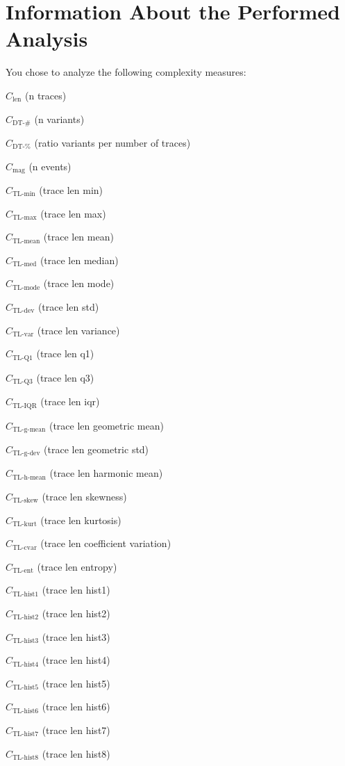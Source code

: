 \documentclass[a4paper]{article}
\newcommand{\magnitudename}{\text{mag}}
\newcommand{\magnitude}{C_{\magnitudename}}
\newcommand{\lengthname}{\text{len}}
\newcommand{\length}{C_{\lengthname}}
\newcommand{\tlminname}{\text{TL-min}}
\newcommand{\tlmin}{C_{\tlminname}}
\newcommand{\tlavgname}{\text{TL-mean}}
\newcommand{\tlavg}{C_{\tlavgname}}
\newcommand{\tlmaxname}{\text{TL-max}}
\newcommand{\tlmax}{C_{\tlmaxname}}
\newcommand{\tlmedname}{\text{TL-med}}
\newcommand{\tlmed}{C_{\tlmedname}}
\newcommand{\tlmodename}{\text{TL-mode}}
\newcommand{\tlmode}{C_{\tlmodename}}
\newcommand{\tldevname}{\text{TL-dev}}
\newcommand{\tldev}{C_{\tldevname}}
\newcommand{\tlvarname}{\text{TL-var}}
\newcommand{\tlvar}{C_{\tlvarname}}
\newcommand{\tlqonename}{\text{TL-Q1}}
\newcommand{\tlqone}{C_{\tlqonename}}
\newcommand{\tlqthreename}{\text{TL-Q3}}
\newcommand{\tlqthree}{C_{\tlqthreename}}
\newcommand{\tliqrname}{\text{TL-IQR}}
\newcommand{\tliqr}{C_{\tliqrname}}
\newcommand{\tlgmeanname}{\text{TL-g-mean}}
\newcommand{\tlgmean}{C_{\tlgmeanname}}
\newcommand{\tlgdevname}{\text{TL-g-dev}}
\newcommand{\tlgdev}{C_{\tlgdevname}}
\newcommand{\tlhmeanname}{\text{TL-h-mean}}
\newcommand{\tlhmean}{C_{\tlhmeanname}}
\newcommand{\tlskewnessname}{\text{TL-skew}}
\newcommand{\tlskewness}{C_{\tlskewnessname}}
\newcommand{\tlkurtosisname}{\text{TL-kurt}}
\newcommand{\tlkurtosis}{C_{\tlkurtosisname}}
\newcommand{\tlcvariationname}{\text{TL-cvar}}
\newcommand{\tlcvariation}{C_{\tlcvariationname}}
\newcommand{\tlentropyname}{\text{TL-ent}}
\newcommand{\tlentropy}{C_{\tlentropyname}}
\newcommand{\tlhistonename}{\text{TL-hist1}}
\newcommand{\tlhistone}{C_{\tlhistonename}}
\newcommand{\tlhisttwoname}{\text{TL-hist2}}
\newcommand{\tlhisttwo}{C_{\tlhisttwoname}}
\newcommand{\tlhistthreename}{\text{TL-hist3}}
\newcommand{\tlhistthree}{C_{\tlhistthreename}}
\newcommand{\tlhistfourname}{\text{TL-hist4}}
\newcommand{\tlhistfour}{C_{\tlhistfourname}}
\newcommand{\tlhistfivename}{\text{TL-hist5}}
\newcommand{\tlhistfive}{C_{\tlhistfivename}}
\newcommand{\tlhistsixname}{\text{TL-hist6}}
\newcommand{\tlhistsix}{C_{\tlhistsixname}}
\newcommand{\tlhistsevenname}{\text{TL-hist7}}
\newcommand{\tlhistseven}{C_{\tlhistsevenname}}
\newcommand{\tlhisteightname}{\text{TL-hist8}}
\newcommand{\tlhisteight}{C_{\tlhisteightname}}
\newcommand{\numberuniquetracesname}{\text{DT-\#}}
\newcommand{\numberuniquetraces}{C_{\numberuniquetracesname}}
\newcommand{\percentageuniquetracesname}{\text{DT-\%}}
\newcommand{\percentageuniquetraces}{C_{\percentageuniquetracesname}}
\begin{document}
\section*{Information About the Performed Analysis}

You chose to analyze the following complexity measures:
\begin{compactenum}
\item $\length$ (n traces)
\item $\numberuniquetraces$ (n variants)
\item $\percentageuniquetraces$ (ratio variants per number of traces)
\item $\magnitude$ (n events)
\item $\tlmin$ (trace len min)
\item $\tlmax$ (trace len max)
\item $\tlavg$ (trace len mean)
\item $\tlmed$ (trace len median)
\item $\tlmode$ (trace len mode)
\item $\tldev$ (trace len std)
\item $\tlvar$ (trace len variance)
\item $\tlqone$ (trace len q1)
\item $\tlqthree$ (trace len q3)
\item $\tliqr$ (trace len iqr)
\item $\tlgmean$ (trace len geometric mean)
\item $\tlgdev$ (trace len geometric std)
\item $\tlhmean$ (trace len harmonic mean)
\item $\tlskewness$ (trace len skewness)
\item $\tlkurtosis$ (trace len kurtosis)
\item $\tlcvariation$ (trace len coefficient variation)
\item $\tlentropy$ (trace len entropy)
\item $\tlhistone$ (trace len hist1)
\item $\tlhisttwo$ (trace len hist2)
\item $\tlhistthree$ (trace len hist3)
\item $\tlhistfour$ (trace len hist4)
\item $\tlhistfive$ (trace len hist5)
\item $\tlhistsix$ (trace len hist6)
\item $\tlhistseven$ (trace len hist7)
\item $\tlhisteight$ (trace len hist8)

\end{compactenum}
\end{document}
